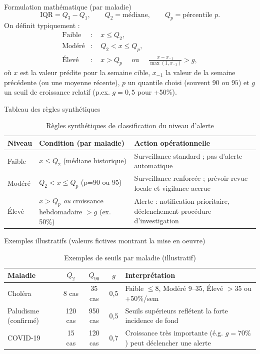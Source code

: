 Formulation mathématique (par maladie)
\[
\text{IQR} = Q_{3} - Q_{1},\qquad Q_{2} = \text{médiane},\qquad Q_{p} = \text{p\'ercentile } p.
\]
On définit typiquement :
\begin{align*}
\text{Faible} &:\quad x \le Q_{2},\\
\text{Mod\'er\'e} &:\quad Q_{2} < x \le Q_{p},\\
\text{\'Elev\'e} &:\quad x > Q_{p} \quad\text{ ou }\quad \frac{x - x_{-1}}{\max(1,x_{-1})} > g,
\end{align*}
où $x$ est la valeur pr\'edite pour la semaine cible, $x_{-1}$ la valeur de la semaine pr\'ec\'edente (ou une moyenne r\'ecente), $p$ un quantile choisi (souvent $90$ ou $95$) et $g$ un seuil de croissance relatif (p.ex. $g=0{,}5$ pour +50\%).

Tableau des règles synthétiques
\begin{table}[H]
  \centering
  \begin{tabular}{|p{3.6cm}|p{7.6cm}|p{4cm}|}
    \hline
    \textbf{Niveau} & \textbf{Condition (par maladie)} & \textbf{Action opérationnelle} \\
    \hline
    Faible & $x \le Q_{2}$ (médiane historique) & Surveillance standard ; pas d'alerte automatique \\
    \hline
    Modéré & $Q_{2} < x \le Q_{p}$ (p=90 ou 95) & Surveillance renforcée ; prévoir revue locale et vigilance accrue \\
    \hline
    Élevé & $x > Q_{p}$ \textit{ou} croissance hebdomadaire $> g$ (ex. 50\%) & Alerte : notification prioritaire, déclenchement procédure d'investigation \\
    \hline
  \end{tabular}
  \caption{Règles synthétiques de classification du niveau d'alerte}
  \label{tab:alerte_regles}
\end{table}

Exemples illustratifs (valeurs fictives montrant la mise en oeuvre)
\begin{table}[H]
  \centering
  \begin{tabular}{|l|c|c|c|p{4.5cm}|}
    \hline
    \textbf{Maladie} & $Q_{2}$ & $Q_{90}$ & $g$ & \textbf{Interpr\'etation} \\
    \hline
    Choléra & 8 cas & 35 cas & 0{,}5 & Faible $\le 8$, Mod\'er\'e 9--35, Élev\'e $>35$ ou +50\%/sem \\
    \hline
    Paludisme (confirmé) & 120 cas & 950 cas & 0{,}5 & Seuils supérieurs refl\'etent la forte incidence de fond \\
    \hline
    COVID‑19 & 15 cas & 120 cas & 0{,}7 & Croissance tr\`es importante (\'e.g. $g=70\%$) peut d\'eclencher une alerte \\
    \hline
  \end{tabular}
  \caption{Exemples de seuils par maladie (illustratif)}
  \label{tab:alerte_exemples}
\end{table}

